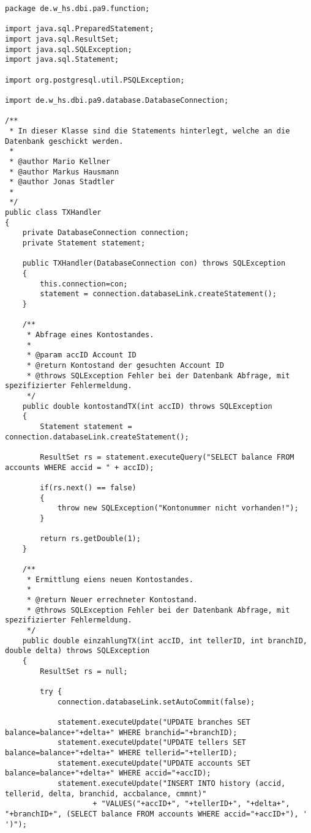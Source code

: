 \begin{lstlisting}[caption={TXHandler}, label={lst:pr4}]
package de.w_hs.dbi.pa9.function;

import java.sql.PreparedStatement;
import java.sql.ResultSet;
import java.sql.SQLException;
import java.sql.Statement;

import org.postgresql.util.PSQLException;

import de.w_hs.dbi.pa9.database.DatabaseConnection;

/**
 * In dieser Klasse sind die Statements hinterlegt, welche an die Datenbank geschickt werden.
 * 
 * @author Mario Kellner
 * @author Markus Hausmann
 * @author Jonas Stadtler
 *
 */
public class TXHandler 
{
	private DatabaseConnection connection;
	private Statement statement;
	
	public TXHandler(DatabaseConnection con) throws SQLException
	{
		this.connection=con;
		statement = connection.databaseLink.createStatement();
	}
	
	/**
	 * Abfrage eines Kontostandes.
	 * 
	 * @param accID Account ID 
	 * @return Kontostand der gesuchten Account ID
	 * @throws SQLException Fehler bei der Datenbank Abfrage, mit spezifizierter Fehlermeldung.
	 */
	public double kontostandTX(int accID) throws SQLException
	{
		Statement statement = connection.databaseLink.createStatement();
		
		ResultSet rs = statement.executeQuery("SELECT balance FROM accounts WHERE accid = " + accID);
		
		if(rs.next() == false)
		{
			throw new SQLException("Kontonummer nicht vorhanden!");
		}
		
		return rs.getDouble(1);
	}
	
	/**
	 * Ermittlung eiens neuen Kontostandes.
	 * 
	 * @return Neuer errechneter Kontostand.
	 * @throws SQLException Fehler bei der Datenbank Abfrage, mit spezifizierter Fehlermeldung.
	 */
	public double einzahlungTX(int accID, int tellerID, int branchID, double delta) throws SQLException
	{
		ResultSet rs = null;
		
		try {
			connection.databaseLink.setAutoCommit(false);
			
			statement.executeUpdate("UPDATE branches SET balance=balance+"+delta+" WHERE branchid="+branchID);
			statement.executeUpdate("UPDATE tellers SET balance=balance+"+delta+" WHERE tellerid="+tellerID);
			statement.executeUpdate("UPDATE accounts SET balance=balance+"+delta+" WHERE accid="+accID);
			statement.executeUpdate("INSERT INTO history (accid, tellerid, delta, branchid, accbalance, cmmnt)"
					+ "VALUES("+accID+", "+tellerID+", "+delta+", "+branchID+", (SELECT balance FROM accounts WHERE accid="+accID+"), ' ')");
			

\end{lstlisting}
